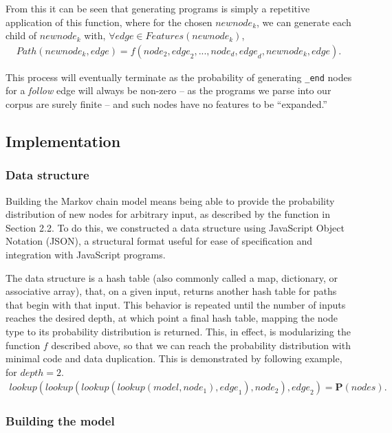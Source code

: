 \documentclass{article}
\begin{document}
From this it can be seen that generating programs is simply a repetitive application of this function, where for the chosen ${newnode}_k$, we can generate each child of ${newnode}_k$ with, $\forall {edge} \in {Features}({newnode}_k)$, \begin{align*}
{Path}({newnode}_k, {edge}) = f({node}_2, {edge}_2, ..., {node}_{d}, {edge}_{d}, {newnode}_k, {edge}).
\end{align*}

This process will eventually terminate as the probability of generating {\tt \_end} nodes for a \emph{follow} edge will always be non-zero -- as the programs we parse into our corpus are surely finite -- and such nodes have no features to be ``expanded.''

\subsection{Implementation}

\subsubsection{Data structure}

Building the Markov chain model means being able to provide the probability distribution of new nodes for arbitrary input,
as described by the function in Section 2.2. To do this, we constructed a data structure using JavaScript Object Notation (JSON),
a structural format useful for ease of specification and integration with JavaScript programs.

The data structure is a hash table (also commonly called a map, dictionary, or associative array), that, on a given input, returns another hash table for paths that begin with that input. This behavior is repeated until the number of inputs reaches the desired depth, at which point a final hash table, mapping the node type to its probability distribution is returned. This, in effect, is modularizing the function $f$ described above, so that we can reach the probability distribution with minimal code and data duplication. This is demonstrated by following example, for  ${depth} = 2$. \begin{align*}
lookup(lookup(lookup(lookup({model}, {node}_1), {edge}_1), {node}_2), {edge}_2) = \textbf{P}({nodes}).
\end{align*}

\subsubsection{Building the model}
\end{document}

